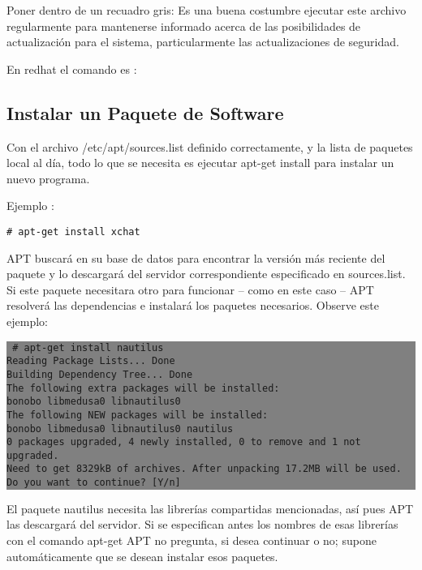 \documentclass[12pt]{article}
\begin{document}
Poner dentro de un recuadro gris:
Es una buena costumbre ejecutar este archivo regularmente para mantenerse informado acerca de las posibilidades de actualización para el sistema, particularmente las actualizaciones de seguridad.

En redhat el comando es :

\subsection*{Instalar un Paquete de Software}

Con el archivo /etc/apt/sources.list definido correctamente, y la lista de paquetes local al día, todo lo
que se necesita es ejecutar apt-get install para instalar un nuevo programa.

Ejemplo :

{\tt     \# apt-get install xchat}

APT buscará en su base de datos para encontrar la versión más reciente del paquete y lo descargará del servidor correspondiente especificado en sources.list. 
Si este paquete necesitara otro para funcionar -- como en este caso -- APT resolverá las dependencias e instalará los paquetes necesarios. Observe este ejemplo:


\colorbox{grey}{\parbox[t]{0.95\linewidth}{ \vspace*{0.5cm} {\tt
     \# apt-get install nautilus \\ 
     Reading Package Lists... Done \\
     Building Dependency Tree... Done\\
     The following extra packages will be installed:\\
       bonobo libmedusa0 libnautilus0\\
     The following NEW packages will be installed:\\
       bonobo libmedusa0 libnautilus0 nautilus\\
     0 packages upgraded, 4 newly installed, 0 to remove and 1 not upgraded.\\
     Need to get 8329kB of archives. After unpacking 17.2MB will be used.\\
     Do you want to continue? [Y/n]\\
 } \vspace*{0.5cm} } } 

El paquete nautilus necesita las librerías compartidas mencionadas, así pues APT las descargará del servidor. Si se especifican antes los nombres de esas librerías con el comando apt-get APT no pregunta, si desea continuar o no; supone automáticamente que se desean instalar esos paquetes.
\end{document}
